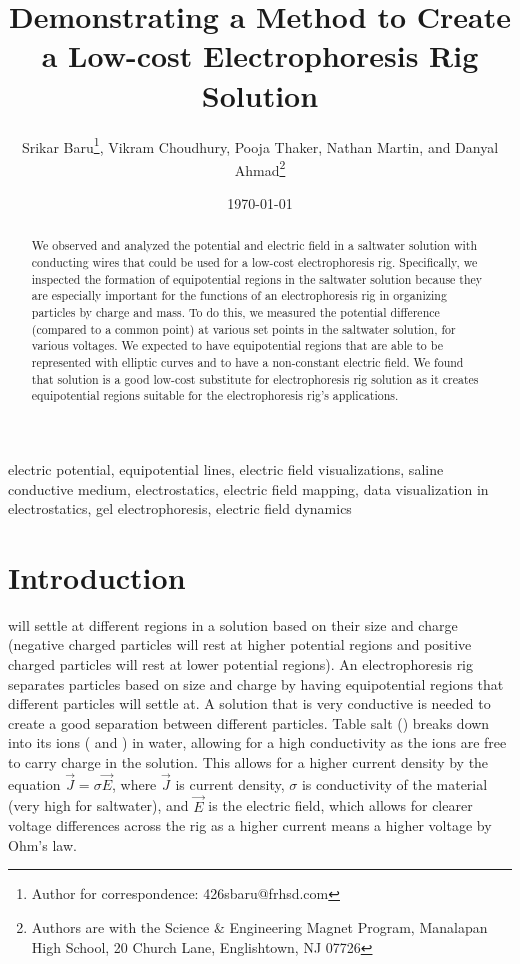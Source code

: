 ﻿\documentclass[10pt,journal,twoside]{IEEEtran}
\title{Demonstrating a Method to Create a Low-cost Electrophoresis Rig Solution\\}
\author{Srikar Baru\thanks{Author for correspondence: 426sbaru@frhsd.com}, Vikram Choudhury, Pooja Thaker, Nathan Martin, and Danyal Ahmad\thanks{Authors are with the Science \& Engineering Magnet Program, Manalapan High School, 20 Church Lane, Englishtown, NJ 07726}}
\date{\today}
\newcommand{\keywords}{electric potential, equipotential lines, electric field visualizations, saline conductive medium, electrostatics, electric field mapping, data visualization in electrostatics, gel electrophoresis, electric field dynamics}
\begin{document}
\maketitle

\begin{abstract}
We observed and analyzed the potential and electric field in a saltwater solution with conducting wires that could be used for a low-cost electrophoresis rig. Specifically, we inspected the formation of equipotential regions in the saltwater solution because they are especially important for the functions of an electrophoresis rig in organizing particles by charge and mass. To do this, we measured the potential difference (compared to a common point) at various set points in the saltwater solution, for various voltages. We expected to have equipotential regions that are able to be represented with elliptic curves and to have a non-constant electric field. We found that solution is a good low-cost substitute for electrophoresis rig solution as it creates equipotential regions suitable for the electrophoresis rig’s applications.
\end{abstract}

\begin{IEEEkeywords}
\keywords
\end{IEEEkeywords}


\section{Introduction}%
 will settle at different regions in a solution based on their size and charge (negative charged particles will rest at higher potential regions and positive charged particles will rest at lower potential regions). An electrophoresis rig separates particles based on size and charge by having equipotential regions that different particles will settle at. A solution that is very conductive is needed to create a good separation between different particles. Table salt () breaks down into its ions ( and ) in water, allowing for a high conductivity as the ions are free to carry charge in the solution. This allows for a higher current density by the equation $\vec{J} = \sigma \vec{E}$, where $\vec{J}$ is current density, $\sigma$ is conductivity of the material (very high for saltwater), and $\vec{E}$ is the electric field, which allows for clearer voltage differences across the rig as a higher current means a higher voltage by Ohm’s law.  
\end{document}
